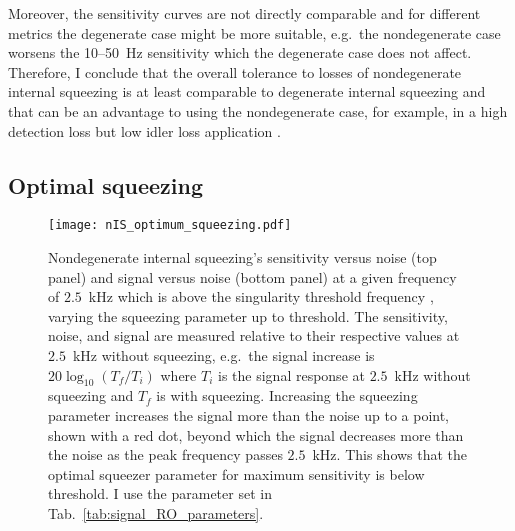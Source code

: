 Moreover, the sensitivity curves are not directly comparable and for different metrics the degenerate case might be more suitable, e.g.\ the nondegenerate case worsens the 10--50~Hz sensitivity which the degenerate case does not affect. %
Therefore, I conclude that the overall tolerance to losses of nondegenerate internal squeezing is at least comparable to degenerate internal squeezing and that can be an advantage to using the nondegenerate case, for example, in a high detection loss but low idler loss application . 


\subsection{Optimal squeezing}
\label{sec:nIS_optimal_squeezing}

\begin{figure}[ht]
	\centering
	\texttt{[image: nIS\_optimum\_squeezing.pdf]}
	\caption{  Nondegenerate internal squeezing's sensitivity versus noise (top panel) and signal versus noise (bottom panel) at a given frequency of $2.5$~kHz which is above the singularity threshold frequency , varying the squeezing parameter up to threshold. The sensitivity, noise, and signal are measured relative to their respective values at $2.5$~kHz without squeezing, e.g.\ the signal increase is $20\log_{10}(T_f/T_i)$ where $T_i$ is the signal response at $2.5$~kHz without squeezing and $T_f$ is with squeezing. Increasing the squeezing parameter increases the signal more than the noise up to a point, shown with a red dot, beyond which the signal decreases more than the noise as the peak frequency passes $2.5$~kHz. This shows that the optimal squeezer parameter  for maximum sensitivity is below threshold. I use the parameter set in Tab.~\ref{tab:signal_RO_parameters}.
    }
	\label{fig:nIS_optimum_squeezing}
\end{figure}

